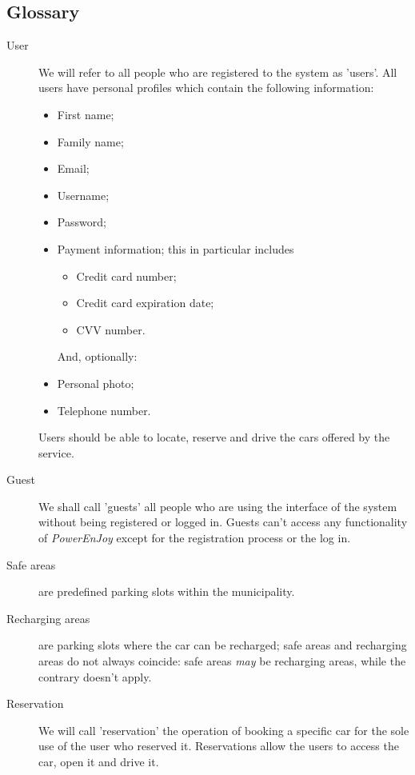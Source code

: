 \documentclass{article}
\begin{document}
		\subsection{Glossary}
			\begin{description}
				\item[User] We will refer to all people who are registered to the system as 'users'. All users have personal profiles which contain the following information:
				\begin{itemize}
					\item First name;
					\item Family name;
					\item Email;
					\item Username;
					\item Password;
					\item Payment information; this in particular includes
						\begin{itemize}
							\item Credit card number;
							\item Credit card expiration date;
							\item CVV number. %
						\end{itemize}
					And, optionally:
					\item Personal photo;
					\item Telephone number.
				\end{itemize}
				Users should be able to locate, reserve and drive the cars offered by the service. 
				
				\item[Guest] We shall call 'guests' all people who are using the interface of the system without being registered or logged in. Guests can't access any functionality of \textit{PowerEnJoy} except for the registration process or the log in. 
				
				\item[Safe areas] are predefined parking slots within the municipality.
				\item[Recharging areas] are parking slots where the car can be recharged; safe areas and recharging areas do not always coincide: safe areas \textit{may} be recharging areas, while the contrary doesn't apply. %
				
				
				\item[Reservation] We will call 'reservation' the operation of booking a specific car for the sole use of the user who reserved it. Reservations allow the users to access the car, open it and drive it. 
				

\end{description}
\end{document}
